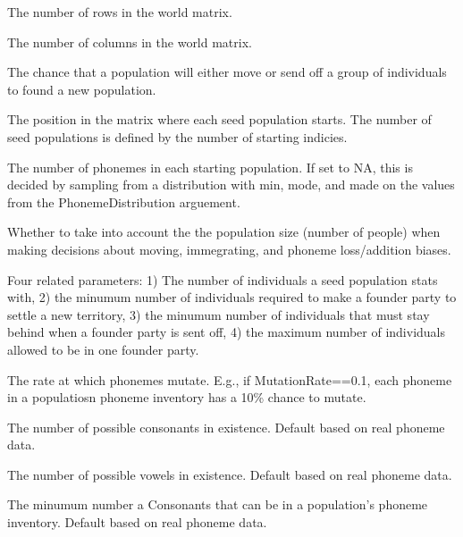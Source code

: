 \documentclass[a4paper]{book}
\begin{document}
\begin{Arguments}
\begin{ldescription}
\item[\code{Rows}] The number of rows in the world matrix.

\item[\code{Cols}] The number of columns in the world matrix.

\item[\code{ChanceExpand}] The chance that a population will either move or send off a group of individuals to found a new population.

\item[\code{PopulationStartIndex}] The position in the matrix where each seed population starts.  The number of seed populations is defined by the number of starting indicies.

\item[\code{NumPopulationPhonemes}] The number of phonemes in each starting population.  If set to NA, this is decided by sampling from a distribution with min, mode, and made on the values from the PhonemeDistribution arguement.

\item[\code{UsePopSize}] Whether to take into account the the population size (number of people) when making decisions about moving, immegrating, and phoneme loss/addition biases.

\item[\code{IndividualsStEmSuEM}] Four related parameters: 1) The number of individuals a seed population stats with, 2) the minumum number of individuals required to make a founder party to settle a new territory, 3) the minumum number of individuals that must stay behind when a founder party is sent off, 4) the maximum number of individuals allowed to be in one founder party.

\item[\code{MutationRate}] The rate at which phonemes mutate.  E.g., if MutationRate==0.1, each phoneme in a populatiosn phoneme inventory has a 10\% chance to mutate.

\item[\code{Consonants}] The number of possible consonants in existence.  Default based on real phoneme data.

\item[\code{Vowels}] The number of possible vowels in existence. Default based on real phoneme data.

\item[\code{MinConsonant}] The minumum number a Consonants that can be in a population's phoneme inventory. Default based on real phoneme data.


\end{ldescription}
\end{Arguments}
\end{document}
